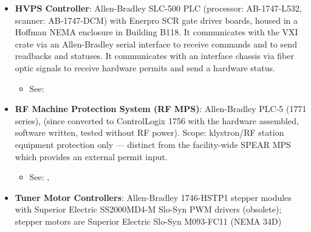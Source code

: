 {\begin{itemize}
  \begin{itemize}
  \tightlist
  \item
     --- Cavity tuner stepper motor control
  \item
     --- HVPS supervisory control and regulation
  \item
     --- RF station state machine control (PEP-II heritage, R. Sass, 1997)
  \item
     --- Drive Power and Gap Voltage RFP/GFF DAC loop (S. Allison, 1997)
  \item
     --- Calibration sequences (R. Claus, SLAC/PEP-II LLRF Group)
  \item
     --- Message logging and CAMAC TAXI error monitoring
  \item
    See: , 
  \end{itemize}
\item
  \textbf{HVPS Controller}: Allen-Bradley SLC-500 PLC (processor: AB-1747-L532, scanner: AB-1747-DCM) with Enerpro SCR gate driver boards, housed in a Hoffman NEMA enclosure in Building B118. It communicates with the VXI crate via an Allen-Bradley serial interface to receive commands and to send readbacks and statuses. It communicates with an interface chassis via fiber optic signals to receive hardware permits and send a hardware status.

  \begin{itemize}
  \tightlist
  \item
    See: 
  \end{itemize}
\item
  \textbf{RF Machine Protection System (RF MPS)}: Allen-Bradley PLC-5 (1771 series), (since converted to ControlLogix 1756 with the hardware assembled, software written, tested without RF power). Scope: klystron/RF station equipment protection only --- distinct from the facility-wide SPEAR MPS which provides an external permit input.

  \begin{itemize}
  \tightlist
  \item
    See: , 
  \end{itemize}
\item
  \textbf{Tuner Motor Controllers}: Allen-Bradley 1746-HSTP1 stepper modules with Superior Electric SS2000MD4-M Slo-Syn PWM drivers (obsolete); stepper motors are Superior Electric Slo-Syn M093-FC11 (NEMA 34D)


\end{itemize}}
